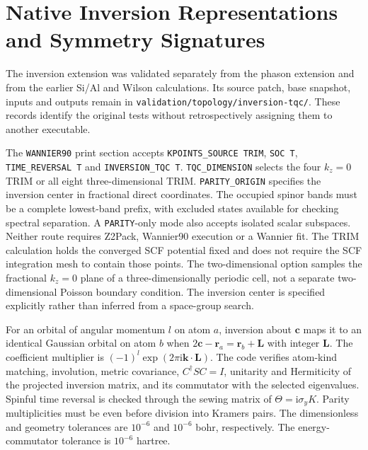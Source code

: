 \documentclass[11pt]{article}
\begin{document}
\section{Native Inversion Representations and Symmetry Signatures}
\label{sec:si-inversion}

The inversion extension was validated separately from the phason
extension and from the earlier Si/Al and Wilson calculations.
Its source patch, base snapshot, inputs and outputs remain in
\texttt{validation/topology/inversion-tqc/}.
These records identify the original tests without retrospectively
assigning them to another executable.

The \texttt{WANNIER90} print section accepts
\texttt{KPOINTS\_SOURCE TRIM}, \texttt{SOC T},
\texttt{TIME\_REVERSAL T} and \texttt{INVERSION\_TQC T}.
\texttt{TQC\_DIMENSION} selects the four $k_z=0$ TRIM or all eight
three-dimensional TRIM. \texttt{PARITY\_ORIGIN} specifies the inversion
center in fractional direct coordinates. The occupied spinor bands must
be a complete lowest-band prefix, with excluded states available for
checking spectral separation. A \texttt{PARITY}-only mode also accepts
isolated scalar subspaces. Neither route requires Z2Pack, Wannier90
execution or a Wannier fit. The TRIM calculation holds the converged
SCF potential fixed and does not require the SCF integration mesh to
contain those points. The two-dimensional option samples the fractional
$k_z=0$ plane of a three-dimensionally periodic cell, not a separate
two-dimensional Poisson boundary condition. The inversion center is
specified explicitly rather than inferred from a space-group search.

For an orbital of angular momentum $l$ on atom $a$, inversion about
$\mathbf c$ maps it to an identical Gaussian orbital on atom $b$ when
$2\mathbf c-\mathbf r_a=\mathbf r_b+\mathbf L$ with integer $\mathbf L$.
The coefficient multiplier is
$(-1)^l\exp(2\pi\mathrm{i}\mathbf k\cdot\mathbf L)$. The code verifies
atom-kind matching, involution, metric covariance, $C^\dagger SC=I$,
unitarity and Hermiticity of the projected inversion matrix, and its
commutator with the selected eigenvalues. Spinful time reversal is
checked through the sewing matrix of $\Theta=\mathrm{i}\sigma_y K$.
Parity multiplicities must be even before division into Kramers pairs.
The dimensionless and geometry tolerances are $10^{-6}$ and
$10^{-6}$ bohr, respectively. The energy-commutator tolerance is
$10^{-6}$ hartree.
\end{document}
